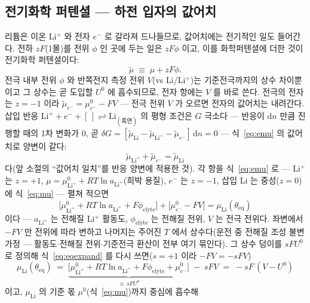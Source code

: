 \documentclass[11pt,a4paper]{article}
\newcommand{\dd}{\mathrm{d}}
\newcommand{\eq}{\mathrm{eq}}
\begin{document}
\subsection{전기화학 퍼텐셜 — 하전 입자의 값어치}
리튬은 이온 Li$^+$ 와 전자 $e^-$ 로 갈라져 드나들므로, 값어치에는 전기적인 일도 들어간다. 전하 $zF$(1몰)를
전위 $\phi$ 인 곳에 두는 일은 $zF\phi$ 이고, 이를 화학퍼텐셜에 더한 것이 전기화학 퍼텐셜이다:
\begin{equation}
\tilde\mu\;\equiv\;\mu+zF\phi.
\label{eq:emu}
\end{equation} 전극 내부 전위 $\phi$ 와 반쪽전지 측정 전위 $V$(vs Li/Li$^+$)는
기준전극까지의 상수 차이뿐이고 그 상수는 곧 도입할 $U^0$ 에 흡수되므로, 전자 항에는 $V$ 를 바로 쓴다.
전극의 전자는 $z=-1$ 이라 $\tilde\mu_{e^-}=\mu_{e^-}^0-FV$ — 전극 전위 $V$ 가 오르면 전자의
값어치는 내려간다. 삽입 반응
$\mathrm{Li}^++e^-+[\,]\rightleftharpoons\mathrm{Li}_{(\text{흑연})}$ 의 평형 조건은 $G$ 극소다 —
반응이 $\dd n$ 만큼 진행할 때의 1차 변화가 $0$, 곧
$\delta G=[\tilde\mu_{\mathrm{Li}}-\tilde\mu_{\mathrm{Li}^+}-\tilde\mu_{e^-}]\,\dd n=0$
— 식~\eqref{eq:emu} 의 값어치로 양변이 같다:
\begin{equation}
\tilde\mu_{\mathrm{Li}^+}+\tilde\mu_{e^-}=\tilde\mu_{\mathrm{Li}}
\label{eq:eqbalance}
\end{equation}
다(앞 소절의 ``값어치 일치''를 반응 양변에 적용한 것). 각 항을 식~\eqref{eq:emu} 로 — Li$^+$ 는
$z{=}{+}1$, $\mu=\mu^0_{\mathrm{Li}^+}{+}RT\ln a_{\mathrm{Li}^+}$(희박 용질), $e^-$ 는
$z{=}{-}1$, 삽입 Li 는 중성($z{=}0$)에 식~\eqref{eq:mu} — 펼쳐 적으면
\begin{equation}
\big[\mu^0_{\mathrm{Li}^+}+RT\ln a_{\mathrm{Li}^+}+F\phi_{\mathrm{elyte}}\big]
+\big[\mu^0_{e^-}-FV\big]
=\mu_{\mathrm{Li}}(\theta_{\eq})
\label{eq:eqexpand}
\end{equation}
이다 — $a_{\mathrm{Li}^+}$ 는 전해질 Li$^+$ 활동도, $\phi_{\mathrm{elyte}}$ 는 전해질 전위, $V$ 는
전극 전위다. 좌변에서 $-FV$ 만 전위에 따라 변하고 나머지는 주어진 $T$ 에서 상수다(운전 중 전해질 조성
불변 가정 — 활동도$\cdot$전해질 전위$\cdot$기준전극 환산이 전부 여기 묶인다). 그 상수 덩이를
$sFU^0$ 로 정의해 식~\eqref{eq:eqexpand} 를 다시 쓰면($s=+1$ 이라 $-FV=-sFV$)
\begin{equation}
\mu_{\mathrm{Li}}(\theta_{\eq})
\;=\;\underbrace{\big[\mu^0_{\mathrm{Li}^+}+RT\ln a_{\mathrm{Li}^+}
+F\phi_{\mathrm{elyte}}+\mu^0_{e^-}\big]}_{\equiv\,sFU^0}\;-\;sFV
\;=\;-sF\,(V-U^0)
\label{eq:constbundle}
\end{equation}
이고, $\mu_{\mathrm{Li}}$ 의 기준 몫 $\mu^0$(식~\eqref{eq:mu})까지 중심에 흡수해
\end{document}
